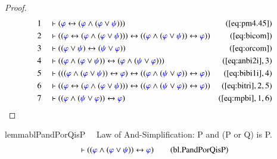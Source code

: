 \begin{proof}
\begin{align}
  1 &&  & \vdash ( \mw{\varphi} \leftrightarrow ( \mw{\varphi} \wedge (
      \mw{\varphi} \vee \mw{\psi} ) )
      )&(\mbox{\ref{eq:pm4.45}})\notag
  \\ 2 &&  & \vdash ( ( \mw{\varphi} \leftrightarrow ( \mw{\varphi} \wedge (
      \mw{\varphi} \vee \mw{\psi} ) ) ) \leftrightarrow ( (
      \mw{\varphi} \wedge ( \mw{\varphi} \vee \mw{\psi} ) )
      \leftrightarrow \mw{\varphi} )
      )&(\mbox{\ref{eq:bicom}})\notag
  \\ 3 &&  & \vdash ( ( \mw{\varphi} \vee \mw{\psi} ) \leftrightarrow (
      \mw{\psi} \vee \mw{\varphi} )
      )&(\mbox{\ref{eq:orcom}})\notag
  \\ 4 &&  & \vdash ( ( \mw{\varphi} \wedge ( \mw{\varphi} \vee \mw{\psi} ) )
      \leftrightarrow ( \mw{\varphi} \wedge ( \mw{\psi}
      \vee \mw{\varphi} ) )
      )&(\mbox{\ref{eq:anbi2i}},3)\notag
  \\ 5 &&  & \vdash ( ( ( \mw{\varphi} \wedge ( \mw{\varphi} \vee \mw{\psi} ) )
      \leftrightarrow \mw{\varphi} ) \leftrightarrow ( (
      \mw{\varphi} \wedge ( \mw{\psi} \vee \mw{\varphi} ) )
      \leftrightarrow \mw{\varphi} )
      )&(\mbox{\ref{eq:bibi1i}},4)\notag
  \\ 6 &&  & \vdash ( ( \mw{\varphi} \leftrightarrow ( \mw{\varphi} \wedge (
      \mw{\varphi} \vee \mw{\psi} ) ) ) \leftrightarrow ( (
      \mw{\varphi} \wedge ( \mw{\psi} \vee \mw{\varphi} ) )
      \leftrightarrow \mw{\varphi} )
      )&(\mbox{\ref{eq:bitri}},2,5)\notag
  \\ 7 &&  & \vdash ( ( \mw{\varphi} \wedge ( \mw{\psi} \vee \mw{\varphi} ) )
      \leftrightarrow \mw{\varphi}
      )&(\mbox{\ref{eq:mpbi}},1,6)\notag
\end{align}
\end{proof}

\begin{restatable}{lemma}{blPandPorQisP}~~ Law of And-Simplification: P and (P
or Q) is P.
\begin{align}
\vdash ( ( \mw{\varphi} \wedge ( \mw{\varphi} \vee \mw{\psi} ) )
    \leftrightarrow \mw{\varphi} )\label{eq:bl.PandPorQisP}\tag{bl.PandPorQisP}
\end{align}
\end{restatable}

